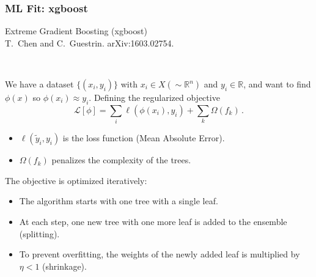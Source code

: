 \documentclass[mathserif, 10pt, dvipsnames]{beamer}
\newcommand\colorcite[1]{{\scriptsize\color{unizarblue}#1}}
\begin{document}
\begin{frame}\frametitle{ML Fit: xgboost}

Extreme Gradient Boosting (xgboost) \\\colorcite{T.~Chen and C.~Guestrin. arXiv:1603.02754}.

    ~

    We have a dataset $\{(x_i, y_i)\}$ with $x_i \in X (\sim\mathbb{R}^n)$ and $y_i \in \mathbb{R}$, and want to find $\phi(x)$ so $\phi(x_i)\approx y_i$. Defining the regularized objective
$$\mathcal{L}[\phi] = \sum_i \ell(\phi(x_i), y_i) + \sum_k \Omega(f_k)\,.$$
    \begin{itemize}
        \item $\ell(\tilde{y}_i, y_i)$ is the loss function (Mean Absolute Error).
        \item $\Omega(f_k)$ penalizes the complexity of the trees.
    \end{itemize}
    The objective is optimized iteratively:
    \begin{itemize}
        \item The algorithm starts with one tree with a single leaf.
        \item At each step, one new tree with one more leaf is added to the ensemble (splitting).
        \item To prevent overfitting, the weights of the newly added leaf is multiplied by $\eta < 1$ (shrinkage).
    \end{itemize}
\end{frame}
\end{document}
